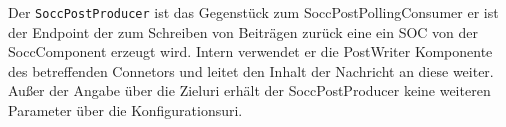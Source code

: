 Der \texttt{SoccPostProducer} ist das Gegenstück zum SoccPostPollingConsumer er ist der Endpoint der zum Schreiben von Beiträgen zurück eine ein SOC von der SoccComponent erzeugt wird. Intern verwendet er die PostWriter Komponente des betreffenden Connetors und leitet den Inhalt der Nachricht an diese weiter. Außer der Angabe über die Zieluri erhält der SoccPostProducer keine weiteren Parameter über die Konfigurationsuri.



